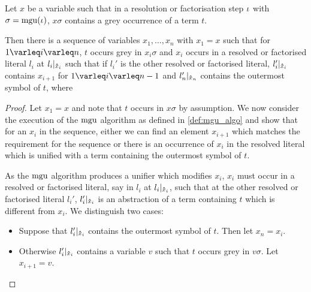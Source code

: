 \documentclass[,%
	draft=false,%
	numbers=noendperiod
	11pt,
	a4paper,
	oneside,%
	openany,
]{memoir}
\begin{document}
\begin{lemma}
	\label{lemma:proof_along_mgu}

	Let $x$ be a variable such that in a resolution or factorisation step $\iota$ with $\sigma = \operatorname{mgu}(\iota)$, $x\sigma$ contains a grey occurrence of a term $t$.

	Then there is a sequence of variables $x_1,\dots, x_n$ with $x_1 = x$ such that for $1\varleq i \varleq n$,
	$t$ occurs grey in $x_i \sigma$ and
	$x_i$ occurs in a resolved or factorised literal $l_i$ at $l_i|_{\bm\hat x_i}$ such that 
	if $l_i'$ is the other resolved or factorised literal,
	$l_i'|_{\bm\hat x_i}$ contains $x_{i+1}$ for $1\varleq i \varleq n-1$ and $l_n'|_{\bm\hat x_n}$ contains the outermost symbol of $t$, 
	where 
\end{lemma}
\begin{proof}
	Let $x_1 = x$ and note that $t$ occurs in $x\sigma$ by assumption.
	We now consider the execution of the $\operatorname{mgu}$ algorithm as defined in \ref{def:mgu_algo} 
	and show that for an $x_i$ in the sequence, either we can find an element $x_{i+1}$ which matches the requirement for the sequence or there is an occurrence of $x_i$ in the resolved literal which is unified with a term containing the outermost symbol of $t$.

	As the $\operatorname{mgu}$ algorithm produces a unifier which modifies $x_i$, $x_i$ must occur in a resolved or factorised literal, say in $l_i$ at $l_i|_{\bm\hat x_i}$, such that at the other resolved or factorised literal $l_i'$,  $l_i'|_{\bm\hat x_i}$ is an abstraction of a term containing $t$ which is different from $x_i$.
	We distinguish two cases:
	\begin{itemize}
		\item Suppose that $l_i'|_{\bm\hat x_i}$ contains the outermost symbol of $t$.
			Then let $x_n = x_i$.

		\item Otherwise $l_i'|_{\bm\hat x_i}$ contains a variable $v$ such that $t$ occurs grey in $v\sigma$.
			Let $x_{i+1} = v$.
			\qedhere
	\end{itemize}


\end{proof}
\end{document}
